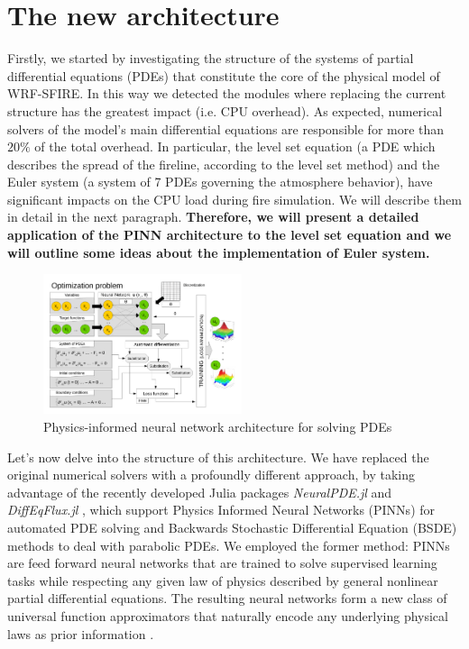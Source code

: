 \documentclass{juliacon}
\begin{document}
\section{The new architecture}
Firstly, we started by investigating the structure of the systems of partial differential equations (PDEs) that constitute the core of the physical model of WRF-SFIRE. In this way we detected the modules where replacing the current structure has the greatest impact (i.e. CPU overhead). As expected, numerical solvers of the model's main differential equations are responsible for more than $20\%$ of the total overhead. In particular, the level set equation (a PDE which describes the spread of the fireline, according to the level set method) and the Euler system (a system of 7 PDEs governing the atmosphere behavior), have significant impacts on the CPU load during fire simulation. We will describe them in detail in the next paragraph.
\textbf{Therefore, we will present a detailed application of the PINN architecture to the level set equation and we will outline some ideas about the implementation of Euler system.} \\

\begin{figure}[t]
\centering
\includegraphics[width=0.518\textwidth]{images/Optimization problem.pdf}
\caption{Physics-informed neural network architecture for solving PDEs}
\label{fig:forcesneural}
\end{figure}

Let's now delve into the structure of this architecture. We have replaced the original numerical solvers with a profoundly different approach, by taking advantage of the recently developed Julia packages \textit{NeuralPDE.jl} and \textit{DiffEqFlux.jl} \cite{DiffEqFlux.jl}, which support Physics Informed Neural Networks (PINNs) for automated PDE solving and Backwards Stochastic Differential Equation (BSDE) methods to deal with parabolic PDEs.
We employed the former method: PINNs are feed forward neural networks that are trained to solve supervised learning tasks while respecting any given law of physics described by general nonlinear partial differential equations. The resulting neural networks form a new class of universal function approximators that naturally encode any underlying physical laws as prior information \cite{zubov}.
\end{document}
